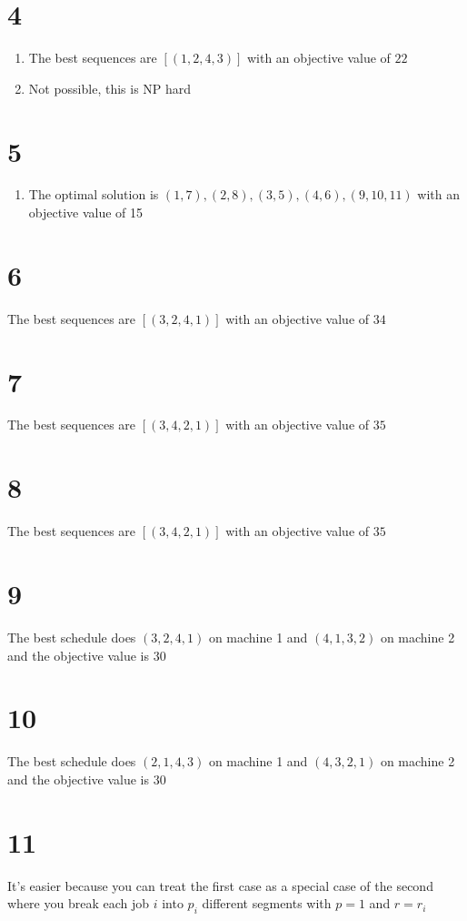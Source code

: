 \documentclass[11pt]{article}
\begin{document}
\section*{4}
    \begin{enumerate}
        \item The best sequences are $[(1, 2, 4, 3)]$ with an objective value of $22$
        \item Not possible, this is NP hard
    \end{enumerate}

\section*{5}
    \begin{enumerate}
        \item The optimal solution is $(1, 7), (2, 8), (3, 5), (4, 6), (9, 10, 11)$ with an objective value of 15
    \end{enumerate}

\section*{6}
The best sequences are $[(3, 2, 4, 1)]$ with an objective value of $34$

\section*{7}
The best sequences are $[(3, 4, 2, 1)]$ with an objective value of $35$

\section*{8}
The best sequences are $[(3, 4, 2, 1)]$ with an objective value of $35$

\section*{9}
The best schedule does $(3, 2, 4, 1)$ on machine 1 and $(4, 1, 3, 2)$ on machine 2 and the objective value is $30$

\section*{10}
The best schedule does $(2, 1, 4, 3)$ on machine 1 and $(4, 3, 2, 1)$ on machine 2 and the objective value is $30$

\section*{11}
It's easier because you can treat the first case as a special case of the second where you break each job $i$ into $p_i$ different segments with $p=1$ and $r=r_i$
\end{document}
